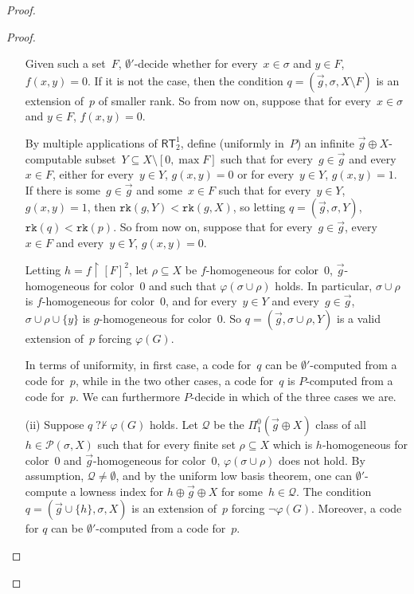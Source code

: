 \documentclass{article}
\def\Q{\mathcal{Q}}
\def\P{\mathcal{P}}
\def\Q{\mathcal{Q}}
\newcommand{\uh}{\upharpoonright}
\newcommand{\nqvdash}{\operatorname{{?}{\nvdash}}}
\newcommand{\RT}[0]{\mathsf{RT}}
\newcommand{\rank}{\mathtt{rk}}
\numberwithin{theorem}{section}
\begin{document}
\begin{proof}
\begin{proof}
\begin{itemize}
    Given such a set~$F$, $\emptyset'$-decide whether for every~$x \in \sigma$ and $y \in F$, $f(x, y) = 0$. If it is not the case, then the condition $q = (\vec{g}, \sigma, X \setminus F)$ is an extension of~$p$ of smaller rank. So from now on, suppose that for every~$x \in \sigma$ and $y \in F$, $f(x, y) = 0$.

    By multiple applications of $\RT^1_2$, define (uniformly in~$P$) an infinite $\vec{g} \oplus X$-computable subset~$Y \subseteq X \setminus [0, \max F]$ such that for every~$g \in \vec{g}$ and every~$x \in F$, either for every~$y \in Y$, $g(x, y) = 0$ or for every~$y \in Y$, $g(x, y) = 1$. If there is some~$g \in \vec{g}$ and some~$x \in F$ such that for every~$y \in Y$, $g(x, y) = 1$, then $\rank(g,  Y) < \rank(g, X)$, so letting $q = (\vec{g}, \sigma, Y)$, $\rank(q) < \rank(p)$. So from now on, suppose that for every~$g \in \vec{g}$, every~$x \in F$ and every~$y \in Y$, $g(x, y) = 0$.
    
    Letting $h = f \uh [F]^2$, let $\rho \subseteq X$ be $f$-homogeneous for color~0, $\vec{g}$-homogeneous for color~0 and such that $\varphi(\sigma \cup \rho)$ holds. In particular, $\sigma \cup \rho$ is $f$-homogeneous for color~0,
    and for every~$y \in Y$ and every~$g \in \vec{g}$, $\sigma \cup \rho \cup \{y\}$ is $g$-homogeneous for color~0.
    So $q = (\vec{g}, \sigma \cup \rho, Y)$ is a valid extension of~$p$ forcing $\varphi(G)$. 
    
    In terms of uniformity, in first case, a code for~$q$ can be $\emptyset'$-computed from a code for~$p$, while in the two other cases, a code for~$q$ is $P$-computed from a code for~$p$. We can furthermore $P$-decide in which of the three cases we are.

    \item[(ii)] Suppose $q \nqvdash \varphi(G)$ holds. Let $\Q$ be the $\Pi^0_1(\vec{g} \oplus X)$ class of all~$h \in \P(\sigma, X)$ such that for every finite set $\rho \subseteq X$ which is $h$-homogeneous for color~0 and $\vec{g}$-homogeneous for color~0, $\varphi(\sigma \cup \rho)$ does not hold. By assumption, $\Q \neq \emptyset$, and by the uniform low basis theorem, one can $\emptyset'$-compute a lowness index for $h \oplus \vec{g} \oplus X$ for some~$h \in \Q$. The condition $q = (\vec{g} \cup \{h\}, \sigma, X)$ is an extension of~$p$ forcing $\neg \varphi(G)$. Moreover, a code for $q$ can be $\emptyset'$-computed from a code for~$p$.
\end{itemize}
\end{proof}
\bigskip


\end{proof}
\end{document}
